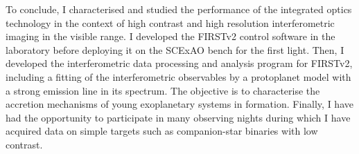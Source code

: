 To conclude, I characterised and studied the performance of the integrated optics technology in the context of high contrast and high resolution interferometric imaging in the visible range. I developed the FIRSTv2 control software in the laboratory before deploying it on the SCExAO bench for the first light. Then, I developed the interferometric data processing and analysis program for FIRSTv2, including a fitting of the interferometric observables by a protoplanet model with a strong emission line in its spectrum. The objective is to characterise the accretion mechanisms of young exoplanetary systems in formation. Finally, I have had the opportunity to participate in many observing nights during which I have acquired data on simple targets such as companion-star binaries with low contrast.


